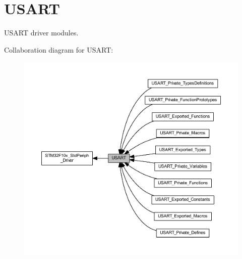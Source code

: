\hypertarget{group___u_s_a_r_t}{}\section{U\+S\+A\+RT}
\label{group___u_s_a_r_t}


U\+S\+A\+RT driver modules.  


Collaboration diagram for U\+S\+A\+RT\+:
\nopagebreak
\begin{figure}[H]
\begin{center}
\leavevmode
\includegraphics[width=350pt]{group___u_s_a_r_t}
\end{center}
\end{figure}
